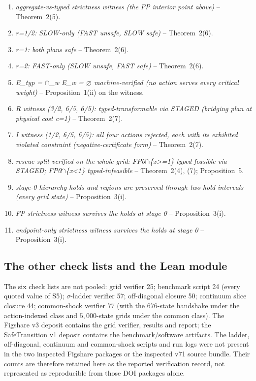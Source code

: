 \documentclass[preprint,11pt,authoryear]{elsarticle}
\theoremstyle{remark}
\begin{document}
\begin{enumerate}[leftmargin=2em,itemsep=1pt]
\item \emph{aggregate-vs-typed strictness witness (the FP interior point above)} -- Theorem~2(5).
\item \emph{r=1/2: SLOW-only (FAST unsafe, SLOW safe)} -- Theorem~2(6).
\item \emph{r=1: both plans safe} -- Theorem~2(6).
\item \emph{r=2: FAST-only (SLOW unsafe, FAST safe)} -- Theorem~2(6).
\item \emph{E\_typ = $\cap$\_w E\_w = $\varnothing$ machine-verified (no action serves every critical weight)} -- Proposition~1(ii) on the witness.
\item \emph{R witness (3/2, 6/5, 6/5): typed-transformable via STAGED (bridging plan at physical cost c=1)} -- Theorem~2(7).
\item \emph{I witness (1/2, 6/5, 6/5): all four actions rejected, each with its exhibited violated constraint (negative-certificate form)} -- Theorem~2(7).
\item \emph{rescue split verified on the whole grid: FP0$\cap$\{x>=1\} typed-feasible via STAGED; FP0$\cap$\{x<1\} typed-infeasible} -- Theorem~2(4), (7); Proposition~5.
\item \emph{stage-0 hierarchy holds and regions are preserved through two hold intervals (every grid state)} -- Proposition~3(i).
\item \emph{FP strictness witness survives the holds at stage 0} -- Proposition~3(i).
\item \emph{endpoint-only strictness witness survives the holds at stage 0} -- Proposition~3(i).
\end{enumerate}

\subsection{The other check lists and the Lean module}

The six check lists are not pooled: grid verifier 25; benchmark script 24 (every quoted value of S5); $\sigma$-ladder verifier 57; off-diagonal closure 50; continuum slice closure 44; common-shock verifier 77 (with the 676-state handshake under the action-indexed class and $5{,}000$-state grids under the common class). The Figshare v3 deposit contains the grid verifier, results and report; the SafeTransition v1 deposit contains the benchmark/software artifacts. The ladder, off-diagonal, continuum and common-shock scripts and run logs were not present in the two inspected Figshare packages or the inspected v71 source bundle. Their counts are therefore retained here as the reported verification record, not represented as reproducible from those DOI packages alone.
\end{document}
